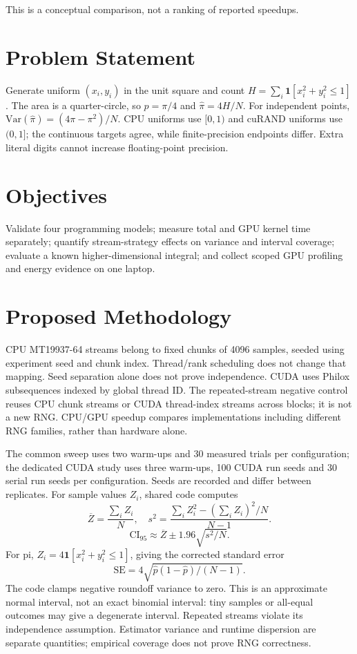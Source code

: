 This is a conceptual comparison, not a ranking of reported speedups.
\section{Problem Statement}
Generate uniform $(x_i,y_i)$ in the unit square and count
$H=\sum_i\mathbf{1}[x_i^2+y_i^2\leq1]$. The area is a quarter-circle, so
$p=\pi/4$ and $\widehat\pi=4H/N$. For independent points,
$\mathrm{Var}(\widehat\pi)=(4\pi-\pi^2)/N$.
CPU uniforms use $[0,1)$ and cuRAND uniforms use $(0,1]$;
the continuous targets agree, while finite-precision endpoints differ.
Extra literal digits cannot increase floating-point precision.

\section{Objectives}
Validate four programming models; measure total and GPU kernel time
separately; quantify stream-strategy effects on variance and interval
coverage; evaluate a known higher-dimensional integral; and collect scoped
GPU profiling and energy evidence on one laptop.

\section{Proposed Methodology}
CPU MT19937-64 streams belong to fixed chunks of 4096 samples, seeded using
experiment seed and chunk index. Thread/rank scheduling does not change
that mapping. Seed separation alone does not prove independence. CUDA uses
Philox subsequences indexed by global thread ID. The repeated-stream negative
control reuses CPU chunk streams or CUDA thread-index streams across blocks;
it is not a new RNG. CPU/GPU speedup compares implementations including
different RNG families, rather than hardware alone.

The common sweep uses two warm-ups and 30 measured trials per configuration;
the dedicated CUDA study uses three warm-ups, 100 CUDA run seeds and 30 serial
run seeds per configuration. Seeds are recorded and differ between replicates.
For sample values $Z_i$, shared code computes
\[
 \overline Z=\frac{\sum_i Z_i}{N},\quad
 s^2=\frac{\sum_i Z_i^2-(\sum_i Z_i)^2/N}{N-1}.
\]
\[
\mathrm{CI}_{95}\approx\overline Z\pm1.96\sqrt{s^2/N}.
\]
For pi, $Z_i=4\mathbf{1}[x_i^2+y_i^2\leq1]$, giving the corrected
standard error
\[\mathrm{SE}=4\sqrt{\widehat p(1-\widehat p)/(N-1)}.\]
The code clamps negative roundoff variance to zero. This is an approximate
normal interval, not an exact binomial interval: tiny samples or all-equal
outcomes may give a degenerate interval. Repeated streams violate its
independence assumption. Estimator variance and runtime dispersion are
separate quantities; empirical coverage does not prove RNG correctness.

